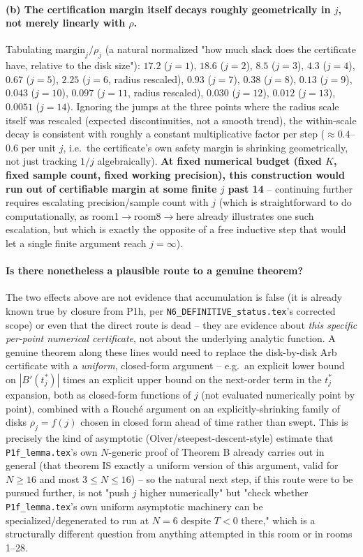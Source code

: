 \documentclass[11pt]{article}
\begin{document}
\paragraph{(b) The certification margin itself decays roughly geometrically in $j$, not merely
linearly with $\rho$.} Tabulating $\mathrm{margin}_j/\rho_j$ (a natural normalized "how much slack
does the certificate have, relative to the disk size"): $17.2$ ($j{=}1$), $18.6$ ($j{=}2$), $8.5$
($j{=}3$), $4.3$ ($j{=}4$), $0.67$ ($j{=}5$), $2.25$ ($j{=}6$, radius rescaled), $0.93$ ($j{=}7$),
$0.38$ ($j{=}8$), $0.13$ ($j{=}9$), $0.043$ ($j{=}10$), $0.097$ ($j{=}11$, radius rescaled),
$0.030$ ($j{=}12$), $0.012$ ($j{=}13$), $0.0051$ ($j{=}14$). Ignoring the jumps at the three points
where the radius scale itself was rescaled (expected discontinuities, not a smooth trend), the
within-scale decay is consistent with roughly a constant multiplicative factor per step
($\approx0.4$--$0.6$ per unit $j$, i.e.\ the certificate's own safety margin is shrinking
geometrically, not just tracking $1/j$ algebraically). \textbf{At fixed numerical budget (fixed
$K$, fixed sample count, fixed working precision), this construction would run out of certifiable
margin at some finite $j$ past 14} -- continuing further requires escalating precision/sample count
with $j$ (which is straightforward to do computationally, as room1$\to$room8$\to$here already
illustrates one such escalation, but which is exactly the opposite of a free inductive step that
would let a single finite argument reach $j=\infty$).

\paragraph{Is there nonetheless a plausible route to a genuine theorem?} The two effects above are
not evidence that accumulation is false (it is already known true by closure from P1h, per
\texttt{N6\_DEFINITIVE\_status.tex}'s corrected scope) or even that the direct route is dead -- they
are evidence about \emph{this specific per-point numerical certificate}, not about the underlying
analytic function. A genuine theorem along these lines would need to replace the disk-by-disk Arb
certificate with a \emph{uniform}, closed-form argument -- e.g.\ an explicit lower bound on
$|B'(t^*_j)|$ times an explicit upper bound on the next-order term in the $t^*_j$ expansion, both as
closed-form functions of $j$ (not evaluated numerically point by point), combined with a Rouch\'e
argument on an explicitly-shrinking family of disks $\rho_j=f(j)$ chosen in closed form ahead of
time rather than swept. This is precisely the kind of asymptotic (Olver/steepest-descent-style)
estimate that \texttt{P1f\_lemma.tex}'s own $N$-generic proof of Theorem B already carries out in
general (that theorem IS exactly a uniform version of this argument, valid for $N\ge16$ and
most $3\le N\le16$) -- so the natural next step, if this route were to be pursued further, is not
"push $j$ higher numerically" but "check whether \texttt{P1f\_lemma.tex}'s own uniform asymptotic
machinery can be specialized/degenerated to run at $N=6$ despite $T<0$ there," which is a
structurally different question from anything attempted in this room or in rooms 1--28.
\end{document}
